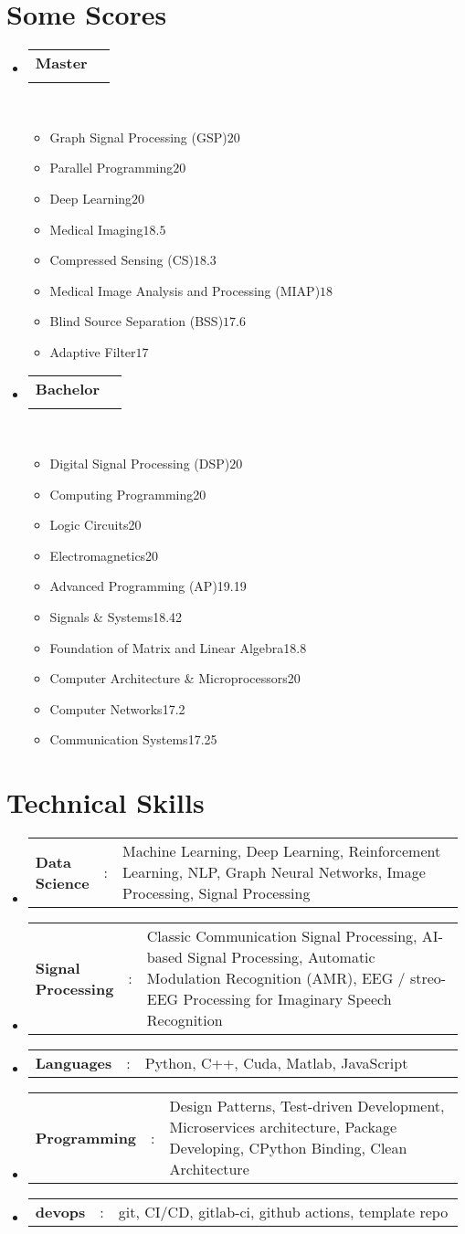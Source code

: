\documentclass[a4paper,11pt]{article}
\makeatletter
\newcommand{\resumeItemScore}[2]{\item[]\small#1\hfill#2}
\newcommand{\resumeItemListStart}{\begin{itemize}[rightmargin=0.11in]}
\newcommand{\resumeItemListEnd}{\end{itemize}}
\newcommand{\resumeSectionType}[3]{
\item\begin{tabular*}{0.96\textwidth}[t]{
p{0.15\linewidth}p{0.02\linewidth}p{0.81\linewidth}
}
\textbf{#1} & #2 & #3
\end{tabular*}\vspace{-2pt}
}
\newcommand{\resumeQuadHeading}[4]{
\item
\begin{tabular*}{0.96\textwidth}[t]{l@{\extracolsep{\fill}}r}
\textbf{#1} & #2 \\
\textit{\small#3} & \textit{\small #4} \\
\end{tabular*}
}
\newcommand{\resumeHeadingListStart}{
\begin{itemize}[leftmargin=0.15in, label={}]
}
\newcommand{\resumeHeadingListEnd}{\end{itemize}}
\makeatother
\begin{document}
\section{Some Scores}
%
\resumeHeadingListStart{}
\resumeQuadHeading{Master}{}{}{}\\\vspace{-1.5em}

\begin{multicols}{2}
\resumeItemListStart{}
\resumeItemScore{Graph Signal Processing (GSP)}{$20$}
\resumeItemScore{Parallel Programming}{$20$}
\resumeItemScore{Deep Learning}{$20$}
\resumeItemScore{Medical Imaging}{$18.5$}
\resumeItemScore{Compressed Sensing (CS)}{$18.3$}
\resumeItemScore{Medical Image Analysis and Processing (MIAP)}{$18$}
\resumeItemScore{Blind Source Separation (BSS)}{$17.6$}
\resumeItemScore{Adaptive Filter}{$17$}
\resumeItemListEnd{}
\end{multicols}


\resumeQuadHeading{Bachelor}{}{}{}\\\vspace{-1.5em}
\begin{multicols}{2}
\resumeItemListStart{}
\resumeItemScore{Digital Signal Processing (DSP)}{$20$}
\resumeItemScore{Computing Programming}{20}
\resumeItemScore{Logic Circuits}{20}
\resumeItemScore{Electromagnetics}{20}
\resumeItemScore{Advanced Programming (AP)}{19.19}
\resumeItemScore{Signals \& Systems}{18.42}
\resumeItemScore{Foundation of Matrix and Linear Algebra}{18.8}
\resumeItemScore{Computer Architecture \& Microprocessors}{20}
\resumeItemScore{Computer Networks}{17.2}
\resumeItemScore{Communication Systems}{17.25}
\resumeItemListEnd{}
\end{multicols}

\resumeHeadingListEnd{}


%



\section{Technical Skills}
\resumeHeadingListStart{}
\resumeSectionType{Data Science}{:}{Machine Learning, Deep Learning, Reinforcement Learning, NLP, Graph Neural Networks, Image Processing, Signal Processing}
\resumeSectionType{Signal Processing}{:}{Classic Communication Signal Processing, AI-based Signal Processing, Automatic Modulation Recognition (AMR), EEG / streo-EEG Processing for Imaginary Speech Recognition}
\resumeSectionType{Languages}{:}{Python, C++, Cuda, Matlab, JavaScript}
\resumeSectionType{Programming}{:}{Design Patterns, Test-driven Development, Microservices architecture, Package Developing, CPython Binding, Clean Architecture}
\resumeSectionType{devops}{:}{git, CI/CD, gitlab-ci, github actions, template repo}
\resumeHeadingListEnd{}
\end{document}
